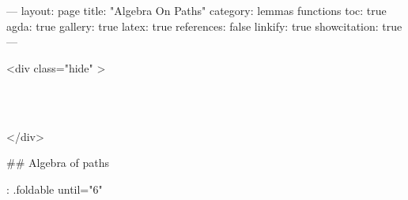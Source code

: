 ---
layout: page
title: "Algebra On Paths"
category: lemmas functions
toc: true
agda: true
gallery: true
latex: true
references: false
linkify: true
showcitation: true
---

<div class="hide" >
\begin{code} %
\>[0]\AgdaSymbol{\{-\#}\AgdaSpace{}%
\AgdaSpace{}%
\AgdaSpace{}%
\AgdaSymbol{\#-\}}\<%
\\
\>[0]\AgdaSpace{}%
\AgdaSpace{}%
\AgdaSpace{}%
\<%
\\
\>[0]\AgdaSpace{}%
\AgdaSpace{}%
\AgdaSpace{}%
\<%
\end{code}
</div>

## Algebra of paths

{: .foldable until="6" }
\begin{code}%
\>[0]\<%
\\
\>[0][@{}l@{\AgdaIndent{0}}]%
\>[2]\AgdaSymbol{:}\AgdaSpace{}%
\AgdaSpace{}%
\AgdaSymbol{\{}\AgdaSpace{}%
\AgdaSymbol{:}\AgdaSpace{}%
\AgdaSpace{}%
\AgdaSymbol{\}}\AgdaSpace{}%
\AgdaSymbol{\{}\AgdaSpace{}%
\AgdaSymbol{:}\AgdaSpace{}%
\AgdaSpace{}%
\AgdaSymbol{\}}\<%
\\
%
\>[2]\AgdaSpace{}%
\AgdaSymbol{(}\AgdaSpace{}%
\AgdaSymbol{:}\AgdaSpace{}%
\AgdaSpace{}%
\AgdaSpace{}%
\AgdaSymbol{)}\AgdaSpace{}%
\AgdaSymbol{\{}\AgdaSpace{}%
\AgdaSpace{}%
\AgdaSymbol{:}\AgdaSpace{}%
\AgdaSymbol{\}}\<%
\\
%
\>[2]\AgdaSpace{}%
\AgdaSpace{}%
\AgdaOperator{\AgdaDatatype{==}}\AgdaSpace{}%
\<%
\\
%
\>[2]\AgdaComment{--------------}\<%
\\
%
\>[2]\AgdaSpace{}%
\AgdaSpace{}%
\AgdaSpace{}%
\AgdaOperator{\AgdaDatatype{==}}\AgdaSpace{}%
\AgdaSpace{}%
\<%
\\
%
\\[\AgdaEmptyExtraSkip]%
\>[0]\AgdaSpace{}%
\AgdaSpace{}%
\AgdaSpace{}%
\AgdaSymbol{=}\AgdaSpace{}%
\<%
\end{code}

